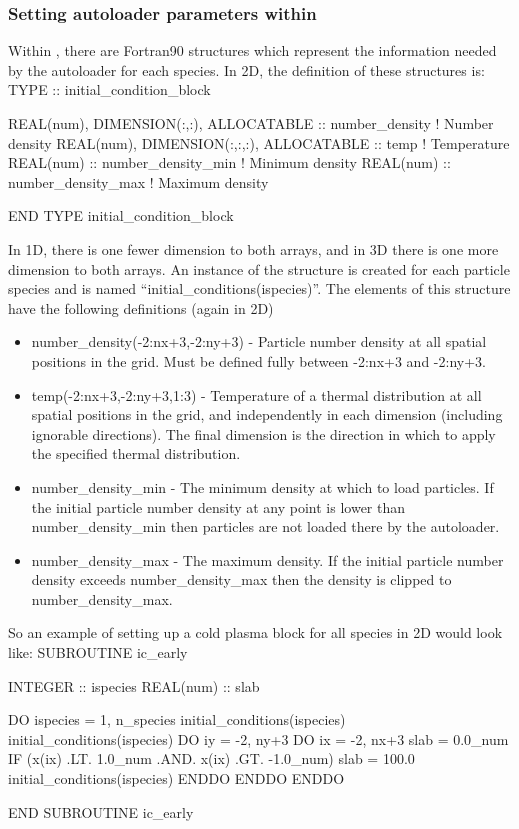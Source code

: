 \documentclass[12pt,a4paper]{article}
\newcommand{\EPOCH}{{\color{warwickdark}\fontfamily{phv}\selectfont{EPOCH}}}
\newenvironment{boxverbatim}{\lboxverbatim{none}}{\endlboxverbatim}
\begin{document}
\subsubsection{Setting autoloader parameters within {\EPOCH}}
Within {\EPOCH}, there are Fortran90 structures which represent the information
needed by the autoloader for each species. In 2D, the definition of these
structures is:
\begin{boxverbatim}
TYPE :: initial_condition_block

  REAL(num), DIMENSION(:,:), ALLOCATABLE :: number_density ! Number density
  REAL(num), DIMENSION(:,:,:), ALLOCATABLE :: temp ! Temperature
  REAL(num) :: number_density_min ! Minimum density
  REAL(num) :: number_density_max ! Maximum density

END TYPE initial_condition_block
\end{boxverbatim}

In 1D, there is one fewer dimension to both arrays, and in 3D there is one
more dimension to both arrays. An instance of the structure is created for
each particle species and is named ``initial\_conditions(ispecies)''. The
elements of this structure have the following definitions (again in 2D)\\
\begin{itemize}
\item number\_density(-2:nx+3,-2:ny+3) - Particle number density at all spatial
  positions in the grid. Must be defined fully between -2:nx+3 and -2:ny+3.
\item temp(-2:nx+3,-2:ny+3,1:3) - Temperature of a thermal distribution at all
  spatial positions in the grid, and independently in each dimension
  (including ignorable directions). The final dimension is the direction in
  which to apply the specified thermal distribution.
\item number\_density\_min - The minimum density at which to load particles. If the initial
  particle number density at any point is lower than number\_density\_min then particles are
  not loaded there by the autoloader.
\item number\_density\_max - The maximum density. If the initial particle number density
  exceeds number\_density\_max then the density is clipped to number\_density\_max.
\end{itemize}

So an example of setting up a cold plasma block for all species in 2D would
look like:
\begin{boxverbatim}
SUBROUTINE ic_early

  INTEGER :: ispecies
  REAL(num) :: slab

  DO ispecies = 1, n_species
    initial_conditions(ispecies)%
    initial_conditions(ispecies)%
    DO iy = -2, ny+3
      DO ix = -2, nx+3
        slab = 0.0_num
        IF (x(ix) .LT. 1.0_num .AND. x(ix) .GT. -1.0_num) slab = 100.0
        initial_conditions(ispecies)%
      ENDDO
    ENDDO
  ENDDO

END SUBROUTINE ic_early
\end{boxverbatim}
\end{document}
